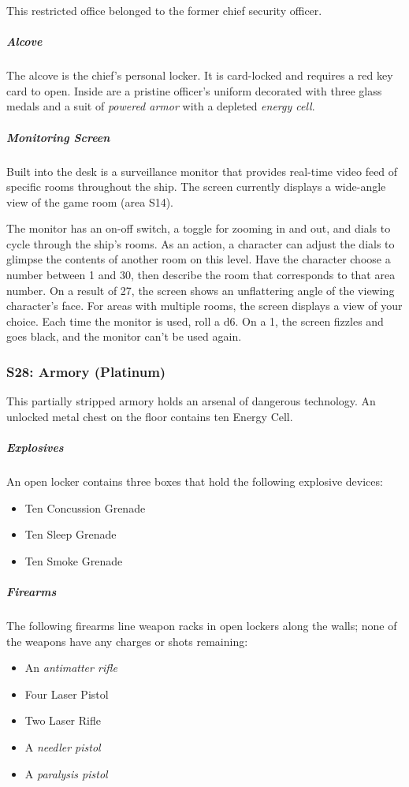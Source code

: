 \documentclass[10pt,a4paper,twoside,bg=print,twocolumn,openany,nodeprecatedcode]{dndbook}
\begin{document}
This restricted office belonged to the former chief security officer.

\subparagraph{Alcove}
The alcove is the chief's personal locker. It is card-locked and requires a red key card to open. Inside are a pristine officer's uniform decorated with three glass medals and a suit of \textit{powered armor} with a depleted \textit{energy cell}.

\subparagraph{Monitoring Screen}
Built into the desk is a surveillance monitor that provides real-time video feed of specific rooms throughout the ship. The screen currently displays a wide-angle view of the game room (area S14).

The monitor has an on-off switch, a toggle for zooming in and out, and dials to cycle through the ship's rooms. As an action, a character can adjust the dials to glimpse the contents of another room on this level. Have the character choose a number between 1 and 30, then describe the room that corresponds to that area number. On a result of 27, the screen shows an unflattering angle of the viewing character's face. For areas with multiple rooms, the screen displays a view of your choice. Each time the monitor is used, roll a d6. On a 1, the screen fizzles and goes black, and the monitor can't be used again.

\subsubsection{S28: Armory (Platinum)}
This partially stripped armory holds an arsenal of dangerous technology. An unlocked metal chest on the floor contains ten Energy Cell.

\subparagraph{Explosives}
An open locker contains three boxes that hold the following explosive devices:


\begin{itemize}
\item Ten Concussion Grenade
\item Ten Sleep Grenade
\item Ten Smoke Grenade
\end{itemize}

\subparagraph{Firearms}
The following firearms line weapon racks in open lockers along the walls; none of the weapons have any charges or shots remaining:


\begin{itemize}
\item An \textit{antimatter rifle}
\item Four Laser Pistol
\item Two Laser Rifle
\item A \textit{needler pistol}
\item A \textit{paralysis pistol}
\end{itemize}
\end{document}
